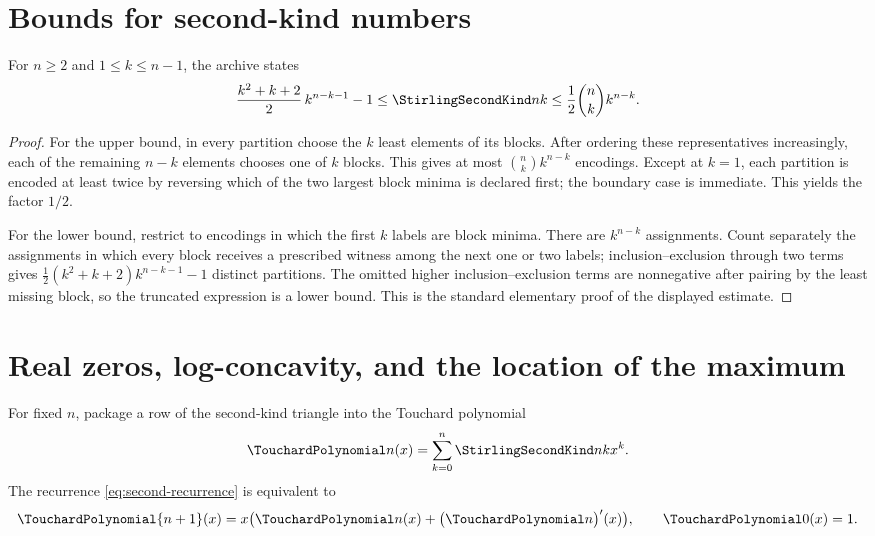 \documentclass[11pt,a4paper,oneside,openany]{book}
\theoremstyle{definition}
\theoremstyle{remark}
\begin{document}
\section{Bounds for second-kind numbers}
For $n\ge2$ and $1\le k\le n-1$, the archive states
\begin{equation}\label{eq:second-bounds}
 \frac{k^2+k+2}{2}\,k^{n-k-1}-1
 \le\StirlingSecondKind nk
 \le\frac12\binom nk k^{n-k}.
\end{equation}
\begin{proof}
For the upper bound, in every partition choose the $k$ least elements of its blocks.
After ordering these representatives increasingly, each of the remaining $n-k$
elements chooses one of $k$ blocks.  This gives at most $\binom nk k^{n-k}$ encodings.
Except at $k=1$, each partition is encoded at least twice by reversing which of the
two largest block minima is declared first; the boundary case is immediate.  This
yields the factor $1/2$.

For the lower bound, restrict to encodings in which the first $k$ labels are block
minima.  There are $k^{n-k}$ assignments.  Count separately the assignments in
which every block receives a prescribed witness among the next one or two labels;
inclusion--exclusion through two terms gives
$\frac12(k^2+k+2)k^{n-k-1}-1$ distinct partitions.  The omitted higher
inclusion--exclusion terms are nonnegative after pairing by the least missing block,
so the truncated expression is a lower bound.  This is the standard elementary
proof of the displayed estimate.
\end{proof}


\section{Real zeros, log-concavity, and the location of the maximum}
For fixed $n$, package a row of the second-kind triangle into the Touchard
polynomial
\[
 \TouchardPolynomial n(x)=\sum_{k=0}^{n}\StirlingSecondKind nk x^k.
\]
The recurrence \eqref{eq:second-recurrence} is equivalent to
\begin{equation}
\label{eq:touchard-differential-recurrence-shape}
 \TouchardPolynomial{n+1}(x)=x\bigl(\TouchardPolynomial n(x)
 +\bigl(\TouchardPolynomial n\bigr)'(x)\bigr),
 \qquad \TouchardPolynomial0(x)=1.
\end{equation}
\end{document}

